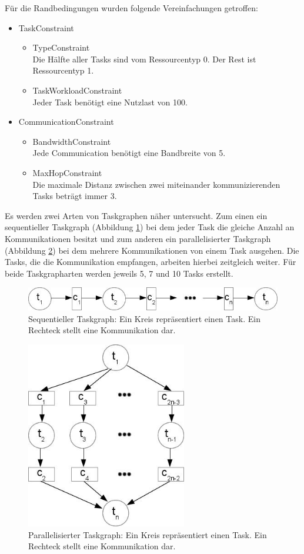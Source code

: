 Für die Randbedingungen wurden folgende Vereinfachungen getroffen:
\begin{itemize}
\item TaskConstraint
\begin{itemize}
\item TypeConstraint\\
Die Hälfte aller Tasks sind vom Ressourcentyp 0. Der Rest ist Ressourcentyp 1.
\item TaskWorkloadConstraint \\
Jeder Task benötigt eine Nutzlast von 100.
\end{itemize}
\item CommunicationConstraint
\begin{itemize}
\item BandwidthConstraint\\
Jede Communication benötigt eine Bandbreite von 5.
\item MaxHopConstraint\\
Die maximale Distanz zwischen zwei miteinander kommunizierenden Tasks beträgt immer 3.
\end{itemize}
\end{itemize}

Es werden zwei Arten von Taskgraphen näher untersucht. Zum einen ein sequentieller Taskgraph (Abbildung \ref{fig:seq}) bei dem jeder Task die gleiche Anzahl an Kommunikationen besitzt und zum anderen ein parallelisierter Taskgraph (Abbildung \ref{fig:par}) bei dem mehrere Kommunikationen von einem Task ausgehen. Die Tasks, die die Kommunikation empfangen, arbeiten hierbei zeitgleich weiter. Für beide Taskgrapharten werden jeweils 5, 7 und 10 Tasks erstellt.
\begin{figure}[H]\centering
  \includegraphics[width = 120mm]{bilder/sequentiell.jpg}
  \caption{Sequentieller Taskgraph: Ein Kreis repräsentiert einen Task. Ein Rechteck stellt eine Kommunikation dar.
  }\label{fig:seq}
\end{figure}

\begin{figure}[H]\centering
  \includegraphics[width = 70mm]{bilder/parallel.jpg}
  \caption{Parallelisierter Taskgraph: Ein Kreis repräsentiert einen Task. Ein Rechteck stellt eine Kommunikation dar.}\label{fig:par}
\end{figure}

